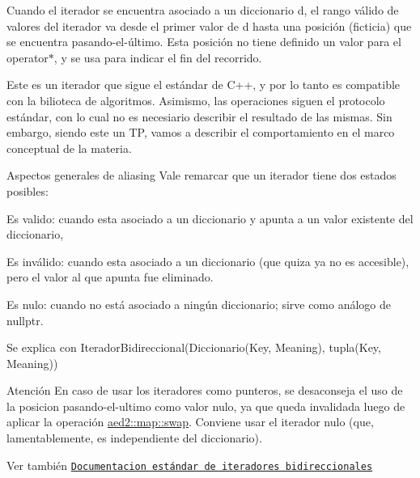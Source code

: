 Cuando el iterador se encuentra asociado a un diccionario {\ttfamily d}, el rango válido de valores del iterador va desde el primer valor de {\ttfamily d} hasta una posición (ficticia) que se encuentra pasando-\/el-\/último. Esta posición no tiene definido un valor para el {\ttfamily operator$\ast$}, y se usa para indicar el fin del recorrido.

Este es un iterador que sigue el estándar de C++, y por lo tanto es compatible con la bilioteca de algoritmos. Asimismo, las operaciones siguen el protocolo estándar, con lo cual no es necesiario describir el resultado de las mismas. Sin embargo, siendo este un TP, vamos a describir el comportamiento en el marco conceptual de la materia.

\begin{DoxyParagraph}{Aspectos generales de aliasing}
Vale remarcar que un iterador tiene dos estados posibles\+:
\begin{DoxyEnumerate}
\item Es valido\+: cuando esta asociado a un diccionario y apunta a un valor existente del diccionario,
\item Es inválido\+: cuando esta asociado a un diccionario (que quiza ya no es accesible), pero el valor al que apunta fue eliminado.
\item Es nulo\+: cuando no está asociado a ningún diccionario; sirve como análogo de {\ttfamily nullptr}. 
\end{DoxyEnumerate}
\end{DoxyParagraph}


\begin{DoxyParagraph}{Se explica con}
Iterador\+Bidireccional(Diccionario(Key, Meaning), tupla(Key, Meaning))
\end{DoxyParagraph}
\begin{DoxyAttention}{Atención}
En caso de usar los iteradores como punteros, se desaconseja el uso de la posicion pasando-\/el-\/ultimo como valor nulo, ya que queda invalidada luego de aplicar la operación \hyperlink{classaed2_1_1map_a43ddb71cc91e5c6021a7a1f243d6cc4a_a43ddb71cc91e5c6021a7a1f243d6cc4a}{aed2\+::map\+::swap}. Conviene usar el iterador nulo (que, lamentablemente, es independiente del diccionario).
\end{DoxyAttention}
\begin{DoxySeeAlso}{Ver también}
\href{http://en.cppreference.com/w/cpp/concept/BidirectionalIterator}{\tt Documentacion estándar de iteradores bidireccionales} 
\end{DoxySeeAlso}



